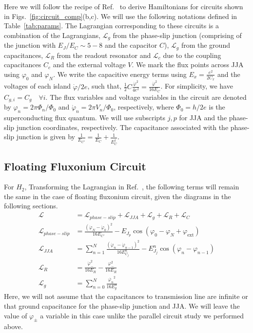 \documentclass[%
reprint,
superscriptaddress,
 amsmath,amssymb,
 aps,
 prx,
longbibliography,
floatfix,
]{revtex4-2}
\begin{document}
Here we will follow the recipe of Ref.~\cite{viola2015collective} to derive Hamiltonians for circuits shown in Figs.~\ref{fig:circuit_comp}(b,c). We will use the following notations defined in Table~\ref{tab:params}. The Lagrangian corresponding to these circuits is a combination of the Lagrangians, $\mathcal{L}_g$ from the phase-slip junction (comprising of the junction with $E_J/E_C\sim 5-8$ and the capacitor $C$), $\mathcal{L}_{g}$ from the ground capacitances, $\mathcal{L}_{R}$ from the readout resonator and $\mathcal{L}_c$ due to the coupling capacitances $C_c$ and the external voltage $V$. We mark the flux points across JJA using $\varphi_0$ and $\varphi_{N}$. We write the capacitive energy terms using $E_x=\frac{e^2}{2C_x}$ and the voltages of each island $\dot{\varphi}/2e$, such that, $\frac{1}{2}C\frac{\dot{\varphi}^2}{4e^2}=\frac{\dot{\varphi}^2}{16E_C}$. For simplicity, we have $C_{g,i}=C_g\quad\forall i$. The flux variables and voltage variables in the circuit are denoted by $\varphi_n=2\pi\Phi_n/\Phi_0$ and $\dot{\varphi}_n=2\pi V_n/\Phi_0$, respectively, where $\Phi_0=h/2e$ is the superconducting flux quantum. We will use subscripts $j, p$ for JJA and the phase-slip junction coordinates, respectively. The capacitance associated with the phase-slip junction is given by $\frac{1}{E_{C'}}=\frac{1}{E_C}+\frac{1}{E^{j}_{C}}$.

\subsection{Floating Fluxonium Circuit}
For $H_2$, Transforming the Lagrangian in Ref.~\cite{viola2015collective}, the following terms will remain the same in the case of floating fluxonium circuit, given the diagrams in the following sections.
\begin{align}
    \mathcal{L}&=\mathcal{L}_{phase-slip}+\mathcal{L}_{JJA}+\mathcal{L}_{g}+\mathcal{L}_{R}+\mathcal{L}_{C}\\
    \mathcal{L}_{phase-slip}&=\frac{(\dot{\varphi}_N-\dot{\varphi}_0)^2}{16E_{C'}}-E_{J_p}\cos(\varphi_0-\varphi_{N}+\varphi_\mathrm{ext})\\
    \mathcal{L}_{JJA}&=\sum_{n=1}^N\frac{(\dot{\varphi}_n-\dot{\varphi}_{n-1})^2}{16E^{n}_{C_j}}-E^{n}_{J_j}\cos(\varphi_n-\varphi_{n-1})\\
    \mathcal{L}_{R}&=\frac{\dot{\varphi}_{-}^2}{16E_{{R}}}-\frac{\varphi_{-}^2}{16E_{R}}\\
    \mathcal{L}_{g}&=\sum_{n=0}^N \frac{\dot{\varphi_n}^2}{16E^n_{g}}\label{eq:float-float}
  \end{align}
  Here, we will not assume that the capacitances to transmission line are infinite or that ground capacitance for the phase-slip junction and JJA. We will leave the value of $\varphi_{\pm}$ a variable in this case unlike the parallel circuit study we performed above.
\end{document}
